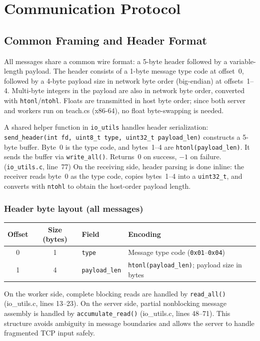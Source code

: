 \documentclass[11pt]{article}
\begin{document}
\section{Communication Protocol}
\label{sec:protocol}

\subsection{Common Framing and Header Format}

All messages share a common wire format: a 5-byte header followed by a
variable-length payload. The header consists of a 1-byte message type code at
offset~0, followed by a 4-byte payload size in network byte order (big-endian)
at offsets~1--4. Multi-byte integers in the payload are also in network byte
order, converted with \texttt{htonl}/\texttt{ntohl}. Floats are transmitted in
host byte order; since both server and workers run on teach.cs (x86-64), no
float byte-swapping is needed.

A shared helper function in \texttt{io\_utils} handles header serialization:
\texttt{send\_header(int fd, uint8\_t type, uint32\_t payload\_len)}
constructs a 5-byte buffer. Byte~0 is the type code, and bytes~1--4 are
\texttt{htonl(payload\_len)}. It sends the buffer via \texttt{write\_all()}.
Returns~0 on success, $-1$ on failure.
(\texttt{io\_utils.c}, line~77)
On the receiving side, header parsing is done inline: the receiver reads
byte~0 as the type code, copies bytes~1--4 into a \texttt{uint32\_t}, and
converts with \texttt{ntohl} to obtain the host-order payload length.

\subsubsection*{Header byte layout (all messages)}

\begin{table}[H]
\centering
\begin{tabular}{@{}c c l l@{}}
\toprule
\textbf{Offset} & \textbf{Size (bytes)} & \textbf{Field} & \textbf{Encoding} \\
\midrule
0 & 1 & \texttt{type} & Message type code (\texttt{0x01}--\texttt{0x04}) \\
1 & 4 & \texttt{payload\_len} & \texttt{htonl(payload\_len)}; payload size in bytes \\
\bottomrule
\end{tabular}
\end{table}

On the worker side, complete blocking reads are handled by \texttt{read\_all()} (io\_utils.c, lines 13--23). On the server side, partial nonblocking message assembly is handled by \texttt{accumulate\_read()} (io\_utils.c, lines 48--71). This structure avoids ambiguity in message boundaries and allows the server to handle fragmented TCP input safely.
\end{document}
